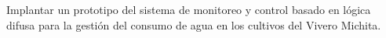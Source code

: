 Implantar un prototipo del sistema de monitoreo y control basado en lógica difusa para la gestión del consumo de agua en los cultivos del Vivero Michita.